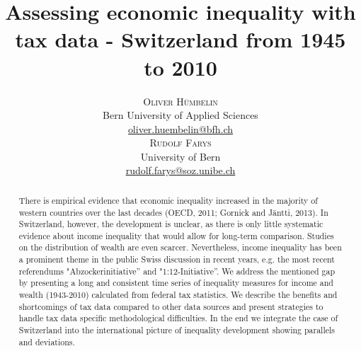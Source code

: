 \documentclass[twoside]{article}
\title{\vspace{-15mm}\fontsize{24pt}{10pt}\selectfont\textbf{Assessing economic inequality with tax data - Switzerland from 1945 to 2010}} %
\author{
\large
\textsc{Oliver Hümbelin}\\[2mm] %
\normalsize Bern University of Applied Sciences \\ %
\normalsize \href{mailto:oliver.huembelin@bfh.ch}{oliver.huembelin@bfh.ch} %
\vspace{5mm}\\
\large
\textsc{Rudolf Farys}\\[2mm] %
\normalsize University of Bern \\ %
\normalsize \href{mailto:rudolf.farys@soz.unibe.ch}{rudolf.farys@soz.unibe.ch} %
\vspace{-5mm}
}
\date{}
\begin{document}
\maketitle 

\thispagestyle{fancy} %





\begin{abstract}

There is empirical evidence that economic inequality increased in the majority of western countries over the last decades (OECD, 2011; Gornick and Jäntti, 2013). In Switzerland, however, the development is unclear, as there is only little systematic evidence about income inequality that would allow for long-term comparison. Studies on the distribution of wealth are even scarcer. Nevertheless, income inequality has been a prominent theme in the public Swiss discussion in recent years, e.g. the most recent referendums "Abzockerinitiative'' and "1:12-Initiative''. We address the mentioned gap by presenting a long and consistent time series of inequality measures for income and wealth (1943-2010) calculated from federal tax statistics. We describe the benefits and shortcomings of tax data compared to other data sources and present strategies to handle tax data specific methodological difficulties. In the end we integrate the case of Switzerland into the international picture of inequality development showing parallels and deviations.


\end{abstract}




\end{document}

